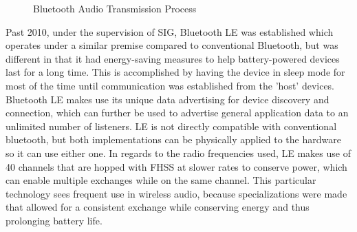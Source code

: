 \documentclass[conference]{IEEEtran}
\begin{document}
\begin{figure}
    \centering
    \caption{Bluetooth Audio Transmission Process}
    \label{fig:bluetooth_process}
\end{figure}

Past 2010, under the supervision of SIG, Bluetooth LE was established which operates under a
similar premise compared to conventional Bluetooth, but was different in that it had
energy-saving measures to help battery-powered devices last for a long time. This is
accomplished by having the device in sleep mode for most of the time until communication was
established from the 'host' devices.\cite{bhalla_unraveling_2021} Bluetooth LE makes use its
unique data advertising for device discovery and connection, which can further be used to
advertise general application data to an unlimited number of listeners. LE is not directly
compatible with conventional bluetooth, but both implementations can be physically applied to
the hardware so it can use either one.\cite{bhalla_unraveling_2021} In regards to the radio
frequencies used, LE makes use of 40 channels that are hopped with FHSS at slower rates to
conserve power, which can enable multiple exchanges while on the same channel.
\cite{noauthor_bluetooth_nodate} This particular technology sees frequent use in wireless
audio, because specializations were made that allowed for a consistent exchange while
conserving energy and thus prolonging battery life.\cite{bhalla_unraveling_2021}
\end{document}
